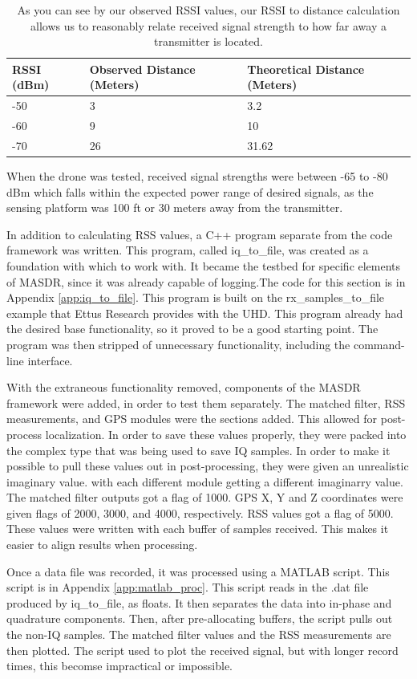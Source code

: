 \begin{table}[ht]
\centering
\label{table:RSSI_Results}
\begin{tabular}{|l|l|l|} \hline
  RSSI (dBm) & Observed Distance (Meters) & Theoretical Distance (Meters) \\ \hline
  -50 & 3 & 3.2 \\
  -60 & 9 & 10 \\
  -70 & 26 & 31.62 \\ \hline
\end{tabular}
\caption{As you can see by our observed RSSI values, our RSSI to distance calculation allows us to reasonably relate received signal strength to how far away a transmitter is located.}
\end{table}\par

When the drone was tested, received signal strengths were between -65 to -80 dBm which falls within the expected power range of desired signals, as the sensing platform was 100 ft or 30 meters away from the transmitter. 

In addition to calculating RSS values, a C++ program separate from the code framework
was written. This program, called iq\_to\_file, was created as a foundation with 
which to work with. It became the testbed for specific elements of MASDR, since it
was already capable of logging.The code for this section is in Appendix \ref{app:iq_to_file}. 
This program is built on the rx\_samples\_to\_file example that Ettus Research provides 
with the UHD. This program already had the desired base functionality, so it proved
to be a good starting point. The program was then stripped of unnecessary functionality,
including the command-line interface. \par
With the extraneous functionality removed, components of the MASDR framework were
added, in order to test them separately. The matched filter, RSS measurements, 
and GPS modules were the sections added. This allowed for post-process localization. In order to 
save these values properly, they were packed into the complex type that was being
used to save IQ samples. In order to make it possible to pull these values out
in post-processing, they were given an unrealistic imaginary value. with each different 
module getting a different imaginarry value. The matched filter outputs got 
a flag of 1000. GPS X, Y and Z coordinates were given flags of 2000, 3000, and 4000,
respectively. RSS values got a flag of 5000. These values were written with each 
buffer of samples received. This makes it easier to align results when processing.\par
Once a data file was recorded, it was processed using a MATLAB script. This script 
is in Appendix \ref{app:matlab_proc}. This script reads in the .dat file produced 
by iq\_to\_file, as floats. It then separates the data into in-phase and quadrature
components. Then, after pre-allocating buffers, the script pulls out the non-IQ 
samples. The matched filter values and the RSS measurements are then plotted. The
script used to plot the received signal, but with longer record times, this
becomse impractical or impossible.

